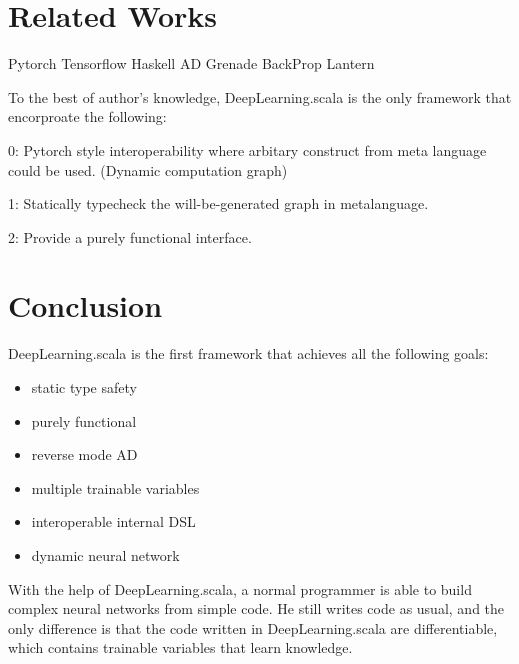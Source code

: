 \section{Related Works}
Pytorch
Tensorflow
Haskell AD
Grenade
BackProp
Lantern

To the best of author's knowledge, DeepLearning.scala is the only framework that encorproate the following:

0: Pytorch style interoperability where arbitary construct from meta language could be used. (Dynamic computation graph)

1: Statically typecheck the will-be-generated graph in metalanguage.

2: Provide a purely functional interface.

\section{Conclusion}

DeepLearning.scala is the first framework that achieves all the following goals:

\begin{itemize}
  \item static type safety
  \item purely functional
  \item reverse mode AD
  \item multiple \glspl{trainable variable}
  \item interoperable internal DSL
  \item dynamic neural network
\end{itemize}

With the help of DeepLearning.scala, a normal programmer is able to build complex neural networks from simple code. He still writes code as usual, and the only difference is that the code written in DeepLearning.scala are differentiable, which contains \glspl{trainable variable} that learn knowledge.

\clearpage
\appendix

\printglossary

\begin{acks}
\end{acks}


